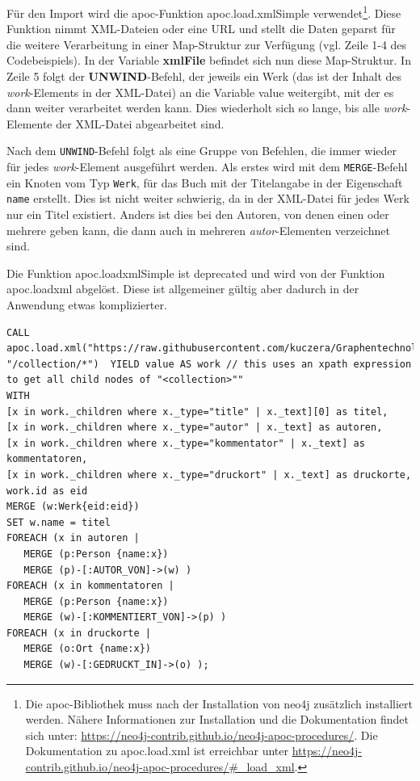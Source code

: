 \documentclass[ngerman,]{scrreprt}
\begin{document}
Für den Import wird die apoc-Funktion apoc.load.xmlSimple verwendet\footnote{Die apoc-Bibliothek muss nach der Installation von neo4j zusätzlich installiert werden. Nähere Informationen zur Installation und die Dokumentation findet sich unter: \url{https://neo4j-contrib.github.io/neo4j-apoc-procedures/}. Die Dokumentation zu apoc.load.xml ist erreichbar unter \url{https://neo4j-contrib.github.io/neo4j-apoc-procedures/\#_load_xml}.}. Diese Funktion nimmt XML-Dateien oder eine URL und stellt die Daten geparst für die weitere Verarbeitung in einer Map-Struktur zur Verfügung (vgl. Zeile 1-4 des Codebeispiels). In der Variable \textbf{xmlFile} befindet sich nun diese Map-Struktur. In Zeile 5 folgt der \textbf{UNWIND}-Befehl, der jeweils ein Werk (das ist der Inhalt des \emph{work}-Elements in der XML-Datei) an die Variable value weitergibt, mit der es dann weiter verarbeitet werden kann. Dies wiederholt sich so lange, bis alle \emph{work}-Elemente der XML-Datei abgearbeitet sind.

Nach dem \texttt{UNWIND}-Befehl folgt als eine Gruppe von Befehlen, die immer wieder für jedes \emph{work}-Element ausgeführt werden. Als erstes wird mit dem \texttt{MERGE}-Befehl ein Knoten vom Typ \texttt{Werk}, für das Buch mit der Titelangabe in der Eigenschaft \texttt{name} erstellt. Dies ist nicht weiter schwierig, da in der XML-Datei für jedes Werk nur ein Titel existiert. Anders ist dies bei den Autoren, von denen einen oder mehrere geben kann, die dann auch in mehreren \emph{autor}-Elementen verzeichnet sind.

Die Funktion apoc.loadxmlSimple ist deprecated und wird von der Funktion apoc.loadxml abgelöst. Diese ist allgemeiner gültig aber dadurch in der Anwendung etwas komplizierter.

\begin{verbatim}
CALL
apoc.load.xml("https://raw.githubusercontent.com/kuczera/Graphentechnologien/master/docs/data/kollatz.xml", "/collection/*")  YIELD value AS work // this uses an xpath expression to get all child nodes of "<collection>""
WITH
[x in work._children where x._type="title" | x._text][0] as titel,
[x in work._children where x._type="autor" | x._text] as autoren,
[x in work._children where x._type="kommentator" | x._text] as kommentatoren,
[x in work._children where x._type="druckort" | x._text] as druckorte,
work.id as eid
MERGE (w:Werk{eid:eid})
SET w.name = titel
FOREACH (x in autoren |
   MERGE (p:Person {name:x})
   MERGE (p)-[:AUTOR_VON]->(w) )
FOREACH (x in kommentatoren |
   MERGE (p:Person {name:x})
   MERGE (w)-[:KOMMENTIERT_VON]->(p) )
FOREACH (x in druckorte |
   MERGE (o:Ort {name:x})
   MERGE (w)-[:GEDRUCKT_IN]->(o) );
\end{verbatim}
\end{document}
